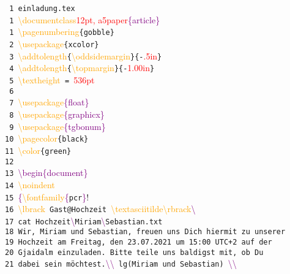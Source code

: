 \documentclass[12pt, a5paper]{article}
\newcommand{\red}[1]{\textcolor{red}{#1}}
\newcommand{\orange}[1]{\textcolor{orange}{#1}}
\newcommand{\purple}[1]{\textcolor{purple}{#1}}
\begin{document}
\noindent
{\selectfont
\verb! 1 einladung.tex!\\
 \verb! 1 !\orange{\textbackslash documentclass}\purple{\lbrack}\red{12pt, a5paper}\purple{\rbrack\{article\}}\\
 \verb! 1 !\orange{\textbackslash pagenumbering}\verb!{gobble}!\\
 \verb! 2 !\orange{\textbackslash usepackage}\verb!{xcolor}!\\
 \verb! 3 !\orange{\textbackslash addtolength}\verb!{!\orange{\textbackslash oddsidemargin}\verb!}{-!\red{.5in}\verb!}!\\
 \verb! 4 !\orange{\textbackslash addtolength}\verb!{!\orange{\textbackslash topmargin}\verb!}{-!\red{1.00in}\verb!}!\\
 \verb! 5 !\orange{\textbackslash textheight}\verb! = !\red{536pt}\\
 \verb! 6 !\\
 \verb! 7 !\orange{\textbackslash usepackage}\purple{\{float\}}\\
 \verb! 8 !\orange{\textbackslash usepackage}\purple{\{graphicx\}}\\
 \verb! 9 !\orange{\textbackslash usepackage}\purple{\{tgbonum\}}\\
 \verb!10 !\orange{\textbackslash pagecolor}\verb!{black}!\\
 \verb!11 !\orange{\textbackslash color}\verb!{green}!\\
 \verb!12 !\\
 \verb!13 !\purple{\textbackslash begin\{document\}}\\
 \verb!14 !\orange{\textbackslash noindent}\\
 \verb!15 !\purple{\{}\orange{\textbackslash fontfamily}\purple{\{}\verb!pcr!\purple{\}}\selectfont!\\
 \verb!16 !\orange{\textbackslash lbrack}\verb! Gast@Hochzeit !\orange{\textbackslash textasciitilde\textbackslash rbrack}\purple{\textbackslash\textdollar}\\
 \verb!17 cat Hochzeit!\purple{\textbackslash\textunderscore}\verb!Miriam!\purple{\textbackslash\textunderscore}\verb!Sebastian.txt!\\
 \verb!18 Wir, Miriam und Sebastian, freuen uns Dich hiermit zu unserer!\\
 \verb!19 Hochzeit am Freitag, den 23.07.2021 um 15:00 UTC+2 auf der!\\
 \verb!20 Gjaidalm einzuladen. Bitte teile uns baldigst mit, ob Du!\\
 \verb!21 dabei sein möchtest.!\purple{\textbackslash\textbackslash}\verb! lg(Miriam und Sebastian) !\purple{\textbackslash\textbackslash}\\
}
\end{document}
